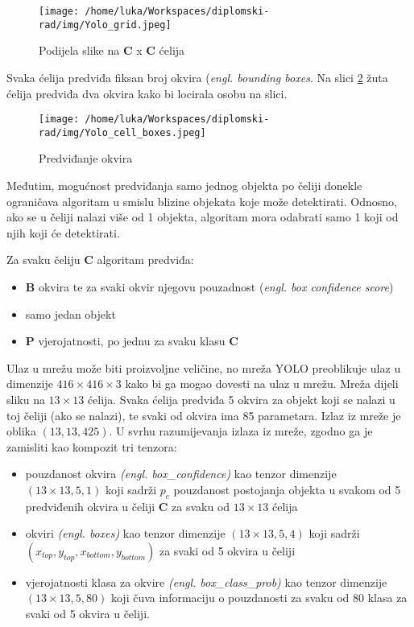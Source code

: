 \begin{figure}[htp]
	\centering
	\texttt{[image: /home/luka/Workspaces/diplomski-rad/img/Yolo\_grid.jpeg]}
	\caption{Podijela slike na \textbf{C} x \textbf{C} ćelija}
	\label{img:yolo_grid_cells}
\end{figure}

Svaka ćelija predviđa fiksan broj okvira (\textit{engl. bounding boxes}. Na slici \ref{img:bounding_boxes} žuta ćelija predviđa dva okvira kako bi locirala osobu na slici. 

\begin{figure}[htp]
\centering
\texttt{[image: /home/luka/Workspaces/diplomski-rad/img/Yolo\_cell\_boxes.jpeg]}
\caption{Predviđanje okvira}
\label{img:bounding_boxes}
\end{figure}

Međutim, mogućnost predviđanja samo jednog objekta po čeliji donekle ograničava algoritam u smislu blizine objekata koje može detektirati. Odnosno, ako se u čeliji nalazi više od 1 objekta, algoritam mora odabrati samo 1 koji od njih koji će detektirati.  

Za svaku čeliju \textbf{C} algoritam predviđa:
\begin{itemize}
	\item \textbf{B} okvira te za svaki okvir njegovu pouzadnost (\textit{engl. box confidence score})
	\item samo jedan objekt
	\item \textbf{P} vjerojatnosti, po jednu za svaku klasu \textbf{C}
\end{itemize}

Ulaz u mrežu može biti proizvoljne veličine, no mreža YOLO preoblikuje ulaz u dimenzije $416\times416\times3$ kako bi ga mogao dovesti na ulaz u mrežu. Mreža dijeli sliku na $13\times13$ ćelija. Svaka ćelija predviđa 5 okvira za objekt koji se nalazi u toj čeliji (ako se nalazi), te svaki od okvira ima 85 parametara. Izlaz iz mreže je oblika $(13, 13, 425)$. U svrhu razumijevanja izlaza iz mreže, zgodno ga je zamisliti kao kompozit tri tenzora:

\begin{itemize}
	\item pouzdanost okvira \textit{(engl. box\_confidence)} kao tenzor dimenzije $(13\times13, 5, 1)$ koji sadrži $p_c$ pouzdanost postojanja objekta u svakom od 5 predviđenih okvira u čeliji \textbf{C} za svaku od $13\times13$ ćelija
	\item okviri \textit{(engl. boxes)} kao tenzor dimenzije $(13\times13, 5, 4)$ koji sadrži $(x_{top}, y_{top}, x_{bottom}, y_{bottom})$ za svaki od 5 okvira u čeliji
	\item vjerojatnosti klasa za okvire \textit{(engl. box\_class\_prob)} kao tenzor dimenzije $(13\times13, 5, 80)$ koji čuva informaciju o pouzdanosti za svaku od 80 klasa za svaki od 5 okvira u čeliji.
\end{itemize}

